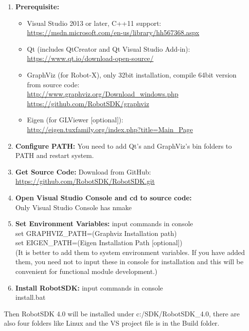 \documentclass[a4paper,10pt]{book}
\begin{document}
\begin{enumerate}
 \item {\bf{Prerequisite:}}
 \begin{itemize}
  \item Visual Studio 2013 or later,  C++11 support: \\ \url{https://msdn.microsoft.com/en-us/library/hh567368.aspx}
  \item Qt (includes QtCreator and Qt Visual Studio Add-in): \\ \url{https://www.qt.io/download-open-source/}
  \item GraphViz (for Robot-X), only 32bit installation, compile 64bit version from source code: \\ \url{http://www.graphviz.org/Download_windows.php} \\
  \url{https://github.com/RobotSDK/graphviz}
  \item Eigen (for GLViewer [optional]): \\ \url{http://eigen.tuxfamily.org/index.php?title=Main_Page}
 \end{itemize}
 \item {\bf{Configure PATH:}} You need to add Qt's and GraphViz's bin folders to PATH and restart system. 
 \item {\bf{Get Source Code:}} Download from GitHub: \\ \url{https://github.com/RobotSDK/RobotSDK.git}
 \item {\bf{Open Visual Studio Console and cd to source code:}} \\ Only Visual Studio Console has nmake
 \item {\bf{Set Environment Variables:}} input commands in console \\
 set GRAPHVIZ\_PATH=(Graphviz Installation path) \\
 set EIGEN\_PATH=(Eigen Installation Path [optional]) \\
 (It is better to add them to system environment variables. If you have added them, you need not to input these in console for installation and this will be convenient for functional module development.)
 \item {\bf{Install RobotSDK:}} input commands in console \\ install.bat
\end{enumerate}

Then RobotSDK 4.0 will be installed under c:/SDK/RobotSDK\_4.0, there are also four folders like Linux and the VS project file is in the Build folder.
\end{document}
